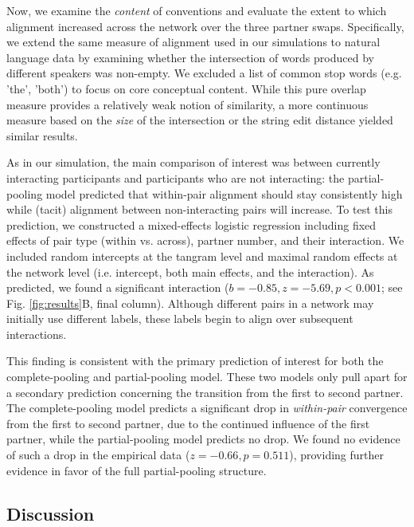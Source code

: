 Now, we examine the \emph{content} of conventions and evaluate the extent to which alignment increased across the network over the three partner swaps. 
Specifically, we extend the same measure of alignment used in our simulations to natural language data by examining whether the intersection of words produced by different speakers was non-empty.
We excluded a list of common stop words (e.g. 'the', 'both') to focus on core conceptual content.
While this pure overlap measure provides a relatively weak notion of similarity, a more continuous measure based on the \emph{size} of the intersection or the string edit distance yielded similar results.

As in our simulation, the main comparison of interest was between currently interacting participants and participants who are not interacting: the partial-pooling model predicted that within-pair alignment should stay consistently high while (tacit) alignment between non-interacting pairs will increase. 
To test this prediction, we constructed a mixed-effects logistic regression including fixed effects of pair type (within vs. across), partner number, and their interaction.
We included random intercepts at the tangram level and maximal random effects at the network level (i.e. intercept, both main effects, and the interaction).
As predicted, we found a significant interaction ($b = -0.85, z = -5.69, p < 0.001$; see Fig. \ref{fig:results}B, final column).
Although different pairs in a network may initially use different labels, these labels begin to align over subsequent interactions. 

This finding is consistent with the primary prediction of interest for both the complete-pooling and partial-pooling model. %
These two models only pull apart for a secondary prediction concerning the transition from the first to second partner.
The complete-pooling model predicts a significant drop in \emph{within-pair} convergence from the first to second partner, due to the continued influence of the first partner, while the partial-pooling model predicts no drop. 
We found no evidence of such a drop in the empirical data ($z=-0.66, p = 0.511$), providing further evidence in favor of the full partial-pooling structure.

\subsection{Discussion}

